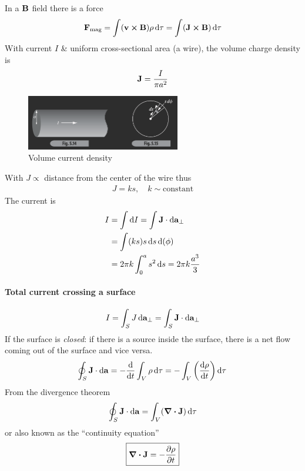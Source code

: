 \documentclass[../main.tex]{subfiles}
\begin{document}
In a $\vb B$ field there is a force
\begin{align*}
    \vb F_\text{mag} = \int (\vb v \cross \vb B) \rho \dd{\tau} = \int (\vb J \cross \vb B) \dd{\tau}
\end{align*}
With current $I$ \& uniform cross-sectional area (a wire), the volume charge density is
\begin{align*}
    \vb J = \frac{I}{\pi a^2}
\end{align*}

\begin{figure}
    \centering
    \includegraphics[width=0.6\textwidth]{fig5_14_15.png}
    \caption{Volume current density}
    \label{fig:fig5_14}
\end{figure}

With $J \propto$ distance from the center of the wire thus
\begin{align*}
    J = ks, \quad k\sim \text{constant}
\end{align*} 
The current is 
\begin{align*}
    I &= \int \dd{I} = \int \vb J \cdot \dd{\vb a_\perp} \\
    &= \int (ks) s \dd{s} \dd(\phi) \\
    &= 2\pi k \int_0^a s^2 \dd{s} = 2\pi k \frac{a^3}{3}
\end{align*}

\paragraph{Total current crossing a surface}
\begin{align*}
    I = \int_S J \dd{\vb a_\perp} = \int_S \vb J \cdot \dd{\vb a_\perp}
\end{align*}
If the surface is \textit{closed}: 
if there is a source inside the surface, there is a net flow coming out of the surface and vice versa.
\begin{align*}
    \oint_S \vb J \cdot \dd{\vb a} = -\dv{t} \int_V \rho \dd{\tau} = - \int_V \qt(\dv{\rho}{t}) \dd{\tau}
\end{align*}
From the divergence theorem
\begin{align*}
    \oint_S \vb J \cdot \dd{\vb a} = \int_V (\div{\vb J}) \dd{\tau}
\end{align*}
or also known as the ``continuity equation''
\begin{align*}
    \boxed{
        \div{\vb J} = -\pdv{\rho}{t}
    }
\end{align*}
\newpage
\end{document}

